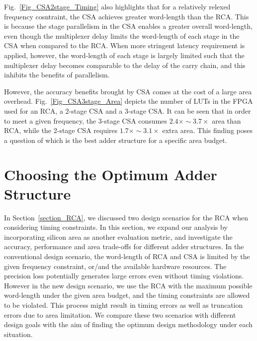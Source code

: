 \documentclass[prodmode,acmtrets]{acmsmall} %
\begin{document}
Fig.~\ref{Fig_CSA2stage_Timing} also highlights that for a relatively relexed frequency cosntraint, the CSA achieves greater word-length than the RCA. This is because the stage parallelism in the CSA enables a greater overall word-length, even though the multiplexer delay limits the word-length of each stage in the CSA when compared to the RCA. When more stringent latency requirement is applied, however, the word-length of each stage is largely limited such that the multiplexer delay becomes comparable to the delay of the carry chain, and this inhibits the benefits of parallelism.


However, the accuracy benefits brought by CSA comes at the cost of a large area overhead. Fig.~\ref{Fig_CSA3stage_Area} depicts the number of LUTs in the FPGA used for an RCA, a 2-stage CSA and a 3-stage CSA. It can be seen that in order to meet a given frequency, the 3-stage CSA consumes $2.4\times\sim3.7\times$ area than RCA, while the 2-stage CSA requires $1.7\times\sim3.1\times$ extra area. This finding poses a question of which is the best adder structure for a specific area budget.

\section{Choosing the Optimum Adder Structure}\label{Section_OptimumAdder}
In Section~\ref{section_RCA}, we discussed two design scenarios for the RCA when considering timing constraints. In this section, we expand our analysis by incorporating silicon area as another evaluation metric, and investigate the accuracy, performance and area trade-offs for different adder structures. In the conventional design scenario, the word-length of RCA and CSA is limited by the given frequency constraint, or/and the available hardware resources. The precision loss potentially generates large errors even without timing violations. However in the new design scenario, we use the RCA with the maximum possible word-length under the given area budget, and the timing constraints are allowed to be violated. This process might result in timing errors as well as truncation errors due to area limitation. We compare these two scenarios with different design goals with the aim of finding the optimum design methodology under each situation.
\end{document}
